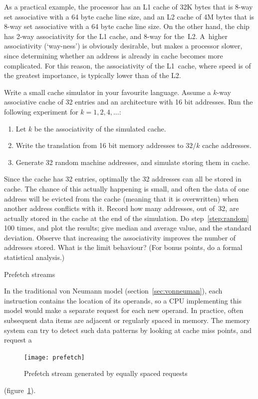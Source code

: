 As a practical example, the
 processor has
an L1 cache of 32K bytes that is 8-way set associative with a 64
  byte cache line size, and
an L2 cache of 4M bytes that is 8-way set associative with a 64
  byte cache line size.
On the other hand, the  chip
has 2-way associativity for the L1 cache, and 8-way for
the~L2. A~higher associativity (`way-ness') is obviously desirable,
but makes a processor slower, since determining whether an address is
already in cache becomes more complicated. For this reason, the
associativity of the L1~cache, where speed is of the greatest
importance, is typically lower than of the L2.

\begin{exercise}
  Write a small cache simulator in your favourite language. Assume a
  $k$-way associative cache of 32 entries and an architecture with 16
  bit addresses. Run the following
  experiment for $k=1,2,4,\ldots$:
  \begin{enumerate}
  \item Let $k$ be the associativity of the simulated cache.
  \item Write the translation from 16 bit memory addresses to $32/k$ 
    cache addresses.
  \item\label{step:random} Generate 32 random machine addresses, and
    simulate storing them in cache.
  \end{enumerate}
  Since the cache has 32 entries, optimally the 32 addresses can all
  be stored in cache. The chance of this actually happening is small,
  and often the data of one address will be evicted from the cache
  (meaning that it is overwritten) when another address conflicts with
  it. Record how many addresses, out of~32, are actually stored in the
  cache at the end of the simulation. Do step~\ref{step:random} 100
  times, and plot the results; give median and average value, and the
  standard deviation. Observe that increasing the associativity
  improves the number of addresses stored. What is the limit
  behaviour? (For bonus points, do a formal statistical analysis.)
\end{exercise}


 {Prefetch streams}
\label{sec:prefetch}

In the traditional von Neumann model (section~\ref{sec:vonneuman}),
each instruction contains the location of its operands, so a CPU
implementing this model would make a separate request for each new
operand. In practice, often subsequent data items are adjacent or
regularly spaced in memory. The memory system can try to detect such
data patterns by looking at cache miss points,
and request a 
\begin{figure}
  \texttt{[image: prefetch]}
  \caption{Prefetch stream generated by equally spaced requests}
  \label{fig:prefetch}
\end{figure}
(figure~\ref{fig:prefetch}).

